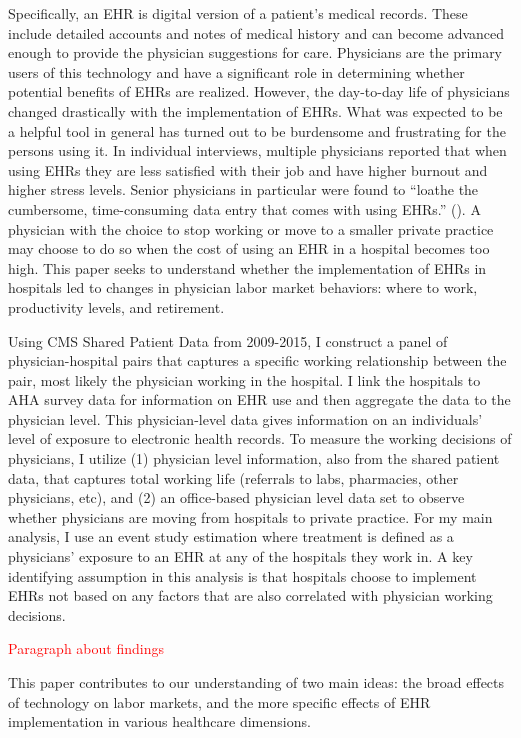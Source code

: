 \documentclass[11pt]{article}
\begin{document}
Specifically, an EHR is digital version of a patient’s medical records. These include detailed accounts and notes of medical history and can become advanced enough to provide the physician suggestions for care. Physicians are the primary users of this technology and have a significant role in determining whether potential benefits of EHRs are realized. However, the day-to-day life of physicians changed drastically with the implementation of EHRs. What was expected to be a helpful tool in general has turned out to be burdensome and frustrating for the persons using it. In individual interviews, multiple physicians reported that when using EHRs they are less satisfied with their job and have higher burnout and higher stress levels. Senior physicians in particular were found to “loathe the cumbersome, time-consuming data entry that comes with using EHRs.” (\cite{CollierBurnout}). A physician with the choice to stop working or move to a smaller private practice may choose to do so when the cost of using an EHR in a hospital becomes too high. This paper seeks to understand whether the implementation of EHRs in hospitals led to changes in physician labor market behaviors: where to work, productivity levels, and retirement.

Using CMS Shared Patient Data from 2009-2015, I construct a panel of physician-hospital pairs that captures a specific working relationship between the pair, most likely the physician working in the hospital. I link the hospitals to AHA survey data for information on EHR use and then aggregate the data to the physician level. This physician-level data gives information on an individuals' level of exposure to electronic health records. To measure the working decisions of physicians, I utilize (1) physician level information, also from the shared patient data, that captures total working life (referrals to labs, pharmacies, other physicians, etc), and (2) an office-based physician level data set to observe whether physicians are moving from hospitals to private practice. For my main analysis, I use an event study estimation where treatment is defined as a physicians' exposure to an EHR at any of the hospitals they work in. A key identifying assumption in this analysis is that hospitals choose to implement EHRs not based on any factors that are also correlated with physician working decisions.  

\textcolor{red}{Paragraph about findings}

This paper contributes to our understanding of two main ideas: the broad effects of technology on labor markets, and the more specific effects of EHR implementation in various healthcare dimensions.
\end{document}
